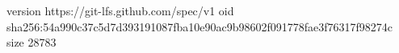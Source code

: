 version https://git-lfs.github.com/spec/v1
oid sha256:54a990c37c5d7d393191087fba10e90ac9b98602f091778fae3f76317f98274c
size 28783

